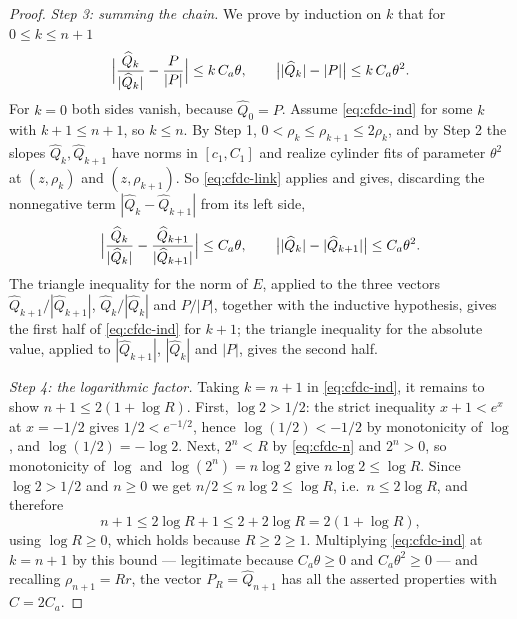 \begin{proof}
\emph{Step 3: summing the chain.}
We prove by induction on $k$ that for $0\le k\le n+1$
\begin{equation}\label{eq:cfdc-ind}
  \Bigl|\frac{\widehat Q_k}{|\widehat Q_k|}-\frac{P}{|P|}\Bigr|\le k\,C_a\theta,
  \qquad \bigl||\widehat Q_k|-|P|\bigr|\le k\,C_a\theta^2 .
\end{equation}
For $k=0$ both sides vanish, because $\widehat Q_0=P$. Assume \eqref{eq:cfdc-ind} for
some $k$ with $k+1\le n+1$, so $k\le n$. By Step 1, $0<\rho_k\le\rho_{k+1}\le2\rho_k$,
and by Step 2 the slopes $\widehat Q_k,\widehat Q_{k+1}$ have norms in $[c_1,C_1]$ and
realize cylinder fits of parameter $\theta^2$ at $(z,\rho_k)$ and $(z,\rho_{k+1})$. So
\eqref{eq:cfdc-link} applies and gives, discarding the nonnegative term
$|\widehat Q_k-\widehat Q_{k+1}|$ from its left side,
\[
  \Bigl|\frac{\widehat Q_k}{|\widehat Q_k|}
     -\frac{\widehat Q_{k+1}}{|\widehat Q_{k+1}|}\Bigr|\le C_a\theta,
  \qquad \bigl||\widehat Q_k|-|\widehat Q_{k+1}|\bigr|\le C_a\theta^2 .
\]
The triangle inequality for the norm of $E$, applied to the three vectors
$\widehat Q_{k+1}/|\widehat Q_{k+1}|$, $\widehat Q_k/|\widehat Q_k|$ and $P/|P|$,
together with the inductive hypothesis, gives the first half of
\eqref{eq:cfdc-ind} for $k+1$; the triangle inequality for the absolute value, applied
to $|\widehat Q_{k+1}|$, $|\widehat Q_k|$ and $|P|$, gives the second half.

\emph{Step 4: the logarithmic factor.}
Taking $k=n+1$ in \eqref{eq:cfdc-ind}, it remains to show $n+1\le2(1+\log R)$. First,
$\log 2>1/2$: the strict inequality $x+1<e^x$ at $x=-1/2$ gives $1/2<e^{-1/2}$, hence
$\log(1/2)<-1/2$ by monotonicity of $\log$, and $\log(1/2)=-\log2$. Next, $2^n<R$ by
\eqref{eq:cfdc-n} and $2^n>0$, so monotonicity of $\log$ and $\log(2^n)=n\log2$ give
$n\log2\le\log R$. Since $\log 2>1/2$ and $n\ge0$ we get $n/2\le n\log 2\le\log R$,
i.e.\ $n\le2\log R$, and therefore
\[
  n+1\le2\log R+1\le2+2\log R=2(1+\log R),
\]
using $\log R\ge0$, which holds because $R\ge2\ge1$. Multiplying
\eqref{eq:cfdc-ind} at $k=n+1$ by this bound --- legitimate because $C_a\theta\ge0$ and
$C_a\theta^2\ge0$ --- and recalling $\rho_{n+1}=Rr$, the vector
$P_R=\widehat Q_{n+1}$ has all the asserted properties with $C=2C_a$.
\end{proof}
